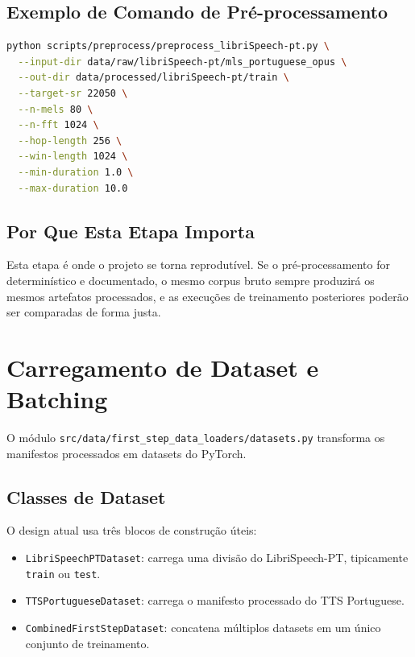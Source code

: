 \documentclass[11pt]{article}
\newcommand{\pathtt}[1]{\texttt{#1}}
\begin{document}
\subsection{Exemplo de Comando de Pré-processamento}

\begin{lstlisting}[language=bash]
python scripts/preprocess/preprocess_libriSpeech-pt.py \
  --input-dir data/raw/libriSpeech-pt/mls_portuguese_opus \
  --out-dir data/processed/libriSpeech-pt/train \
  --target-sr 22050 \
  --n-mels 80 \
  --n-fft 1024 \
  --hop-length 256 \
  --win-length 1024 \
  --min-duration 1.0 \
  --max-duration 10.0
\end{lstlisting}

\subsection{Por Que Esta Etapa Importa}

Esta etapa é onde o projeto se torna reprodutível. Se o pré-processamento for determinístico e documentado, o mesmo corpus bruto sempre produzirá os mesmos artefatos processados, e as execuções de treinamento posteriores poderão ser comparadas de forma justa.

\section{Carregamento de Dataset e Batching}

O módulo \pathtt{src/data/first\_step\_data\_loaders/datasets.py} transforma os manifestos processados em datasets do PyTorch.

\subsection{Classes de Dataset}

O design atual usa três blocos de construção úteis:

\begin{itemize}[leftmargin=1.5em]
  \item \pathtt{LibriSpeechPTDataset}: carrega uma divisão do LibriSpeech-PT, tipicamente \pathtt{train} ou \pathtt{test}.
  \item \pathtt{TTSPortugueseDataset}: carrega o manifesto processado do TTS Portuguese.
  \item \pathtt{CombinedFirstStepDataset}: concatena múltiplos datasets em um único conjunto de treinamento.
\end{itemize}
\end{document}
